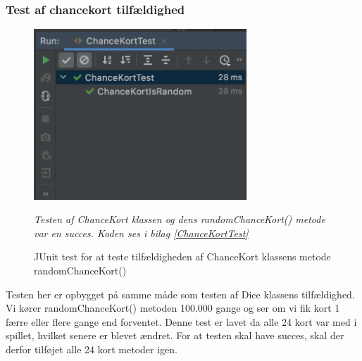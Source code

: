 \subsubsection{Test af chancekort tilfældighed}
    \begin{figure}[H]
        \centering
        \includegraphics[width=8cm]{figures/chanceKortIsRandom.png}
        \caption{JUnit test for at teste tilfældigheden af ChanceKort klassens metode randomChanceKort()}
        \emph{Testen af ChanceKort klassen og dens randomChanceKort() metode var en succes. Koden ses i bilag \ref{ChanceKortTest}}
    \end{figure}
    Testen her er opbygget på samme måde som testen af Dice klassens tilfældighed. Vi kører randomChanceKort() metoden 100.000 gange og ser om vi fik kort 1 færre eller flere gange end forventet. Denne test er lavet da alle 24 kort var med i spillet, hvilket senere er blevet ændret. For at testen skal have succes, skal der derfor tilføjet alle 24 kort metoder igen. 
    
    
